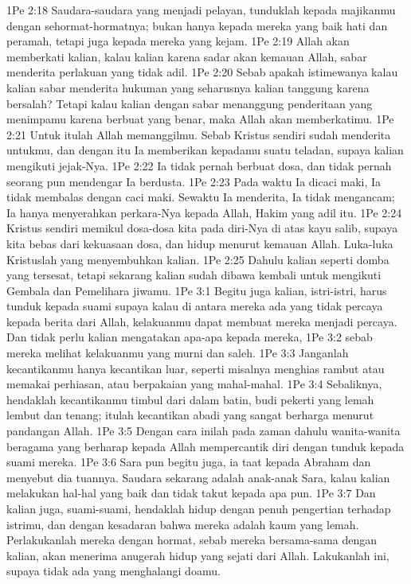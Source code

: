 1Pe 2:18  Saudara-saudara yang menjadi pelayan, tunduklah kepada majikanmu dengan sehormat-hormatnya; bukan hanya kepada mereka yang baik hati dan peramah, tetapi juga kepada mereka yang kejam.
1Pe 2:19  Allah akan memberkati kalian, kalau kalian karena sadar akan kemauan Allah, sabar menderita perlakuan yang tidak adil.
1Pe 2:20  Sebab apakah istimewanya kalau kalian sabar menderita hukuman yang seharusnya kalian tanggung karena bersalah? Tetapi kalau kalian dengan sabar menanggung penderitaan yang menimpamu karena berbuat yang benar, maka Allah akan memberkatimu.
1Pe 2:21  Untuk itulah Allah memanggilmu. Sebab Kristus sendiri sudah menderita untukmu, dan dengan itu Ia memberikan kepadamu suatu teladan, supaya kalian mengikuti jejak-Nya.
1Pe 2:22  Ia tidak pernah berbuat dosa, dan tidak pernah seorang pun mendengar Ia berdusta.
1Pe 2:23  Pada waktu Ia dicaci maki, Ia tidak membalas dengan caci maki. Sewaktu Ia menderita, Ia tidak mengancam; Ia hanya menyerahkan perkara-Nya kepada Allah, Hakim yang adil itu.
1Pe 2:24  Kristus sendiri memikul dosa-dosa kita pada diri-Nya di atas kayu salib, supaya kita bebas dari kekuasaan dosa, dan hidup menurut kemauan Allah. Luka-luka Kristuslah yang menyembuhkan kalian.
1Pe 2:25  Dahulu kalian seperti domba yang tersesat, tetapi sekarang kalian sudah dibawa kembali untuk mengikuti Gembala dan Pemelihara jiwamu.
1Pe 3:1  Begitu juga kalian, istri-istri, harus tunduk kepada suami supaya kalau di antara mereka ada yang tidak percaya kepada berita dari Allah, kelakuanmu dapat membuat mereka menjadi percaya. Dan tidak perlu kalian mengatakan apa-apa kepada mereka,
1Pe 3:2  sebab mereka melihat kelakuanmu yang murni dan saleh.
1Pe 3:3  Janganlah kecantikanmu hanya kecantikan luar, seperti misalnya menghias rambut atau memakai perhiasan, atau berpakaian yang mahal-mahal.
1Pe 3:4  Sebaliknya, hendaklah kecantikanmu timbul dari dalam batin, budi pekerti yang lemah lembut dan tenang; itulah kecantikan abadi yang sangat berharga menurut pandangan Allah.
1Pe 3:5  Dengan cara inilah pada zaman dahulu wanita-wanita beragama yang berharap kepada Allah mempercantik diri dengan tunduk kepada suami mereka.
1Pe 3:6  Sara pun begitu juga, ia taat kepada Abraham dan menyebut dia tuannya. Saudara sekarang adalah anak-anak Sara, kalau kalian melakukan hal-hal yang baik dan tidak takut kepada apa pun.
1Pe 3:7  Dan kalian juga, suami-suami, hendaklah hidup dengan penuh pengertian terhadap istrimu, dan dengan kesadaran bahwa mereka adalah kaum yang lemah. Perlakukanlah mereka dengan hormat, sebab mereka bersama-sama dengan kalian, akan menerima anugerah hidup yang sejati dari Allah. Lakukanlah ini, supaya tidak ada yang menghalangi doamu.
